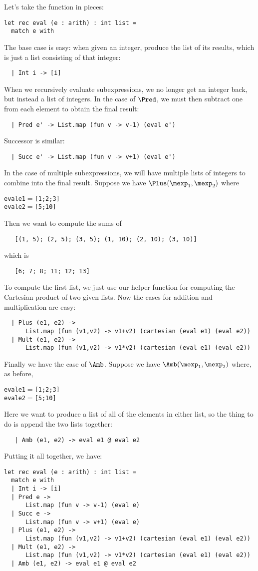 Let's take the function in pieces:
\begin{verbatim}
let rec eval (e : arith) : int list =
  match e with
\end{verbatim}
The base case is easy: when given an integer, produce the list of its
results, which is just a list consisting of that integer:
\begin{verbatim}
  | Int i -> [i]
\end{verbatim}
When we recursively evaluate subexpressions, we no longer get an
integer back, but instead a list of integers.  In the case of $\Pred$,
we must then subtract one from each element to obtain the final result:
\begin{verbatim}
  | Pred e' -> List.map (fun v -> v-1) (eval e')
\end{verbatim}
Successor is similar:
\begin{verbatim}
  | Succ e' -> List.map (fun v -> v+1) (eval e')
\end{verbatim}
In the case of multiple subexpressions, we will have multiple lists of
integers to combine into the final result.  Suppose we have
$\Plus(\mexp_1,\mexp_2)$ where
\begin{alltt}
   eval e1 \(=\) [1; 2; 3]
   eval e2 \(=\) [5; 10]
\end{alltt}
Then we want to compute the sums of
\begin{verbatim}
   [(1, 5); (2, 5); (3, 5); (1, 10); (2, 10); (3, 10)]
\end{verbatim}
which is
\begin{verbatim}
   [6; 7; 8; 11; 12; 13]
\end{verbatim}
To compute the first list, we just use our helper function for computing
the Cartesian product of two given lists.
%
Now the cases for addition and multiplication are easy:
\begin{verbatim}
  | Plus (e1, e2) ->
      List.map (fun (v1,v2) -> v1+v2) (cartesian (eval e1) (eval e2))
  | Mult (e1, e2) ->
      List.map (fun (v1,v2) -> v1*v2) (cartesian (eval e1) (eval e2))
\end{verbatim}
Finally we have the case of $\Amb$.  Suppose we have $\Amb(\mexp_1,\mexp_2)$ where,
as before,
\begin{alltt}
   eval e1 \(=\) [1; 2; 3]
   eval e2 \(=\) [5; 10]
\end{alltt}
Here we want to produce a list of all of the elements in either list,
so the thing to do is append the two lists together:
\begin{verbatim}
   | Amb (e1, e2) -> eval e1 @ eval e2
\end{verbatim}
Putting it all together, we have:
\begin{verbatim}
let rec eval (e : arith) : int list =
  match e with
  | Int i -> [i]
  | Pred e ->
      List.map (fun v -> v-1) (eval e)
  | Succ e ->
      List.map (fun v -> v+1) (eval e)
  | Plus (e1, e2) ->
      List.map (fun (v1,v2) -> v1+v2) (cartesian (eval e1) (eval e2))
  | Mult (e1, e2) ->
      List.map (fun (v1,v2) -> v1*v2) (cartesian (eval e1) (eval e2))
  | Amb (e1, e2) -> eval e1 @ eval e2
\end{verbatim}



